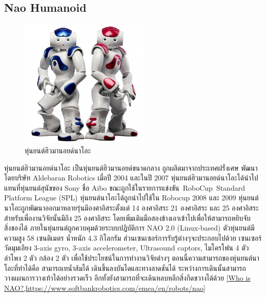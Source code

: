 \subsection*{Nao Humanoid}
\begin{figure}[ht]
    \centering
    \includegraphics[width=0.55\textwidth]{chapter2/images/nao.jpg}
    \caption{หุ่นยนต์ฮิวมานอยด์นาโอะ}
    \label{fig:nao_humanoid}
\end{figure}
หุ่นยนต์ฮิวมานอยด์นาโอะ เป็นหุ่นยนต์ฮิวมานอยด์ขนาดกลาง ถูกผลิตมาจากประเทศฝรั่งเศษ พัฒนาโดยบริษัท Aldebaran Robotics เมื่อปี 2004 และในปี 2007
หุ่นยนต์ฮิวมานอยด์นาโอะได้นำไปแทนที่หุ่นยนต์สุนัขของ Sony ชื่อ Aibo ขณะถูกใช้ในรายการแข่งขัน RoboCup Standard Platform League (SPL) หุ่นยนต์นาโอะได้ถูกนำไปใช้ใน Robocup 2008 และ 2009 
หุ่นยนต์นาโอะถูกพัฒนาออกมาหลายรุ่นมีองศาอิสระตั้งแต่ 14 องศาอิสระ 21 องศาอิสระ และ 25 องศาอิสระ สำหรับเพื่องานวิจัยนั้นมีถึง 25 องศาอิสระ
โดยเพิ่มเติมมือสองข้างเอาเข้าไปเพื่อให้สามารถหยิบจับสิ่งของได้ ภายในหุ่นยนต์ถูกควบคุมด้วยระบบปฎิบัติการ NAO 2.0 (Linux-based) ตัวหุ่นยนต์มีความสูง 58 เซนติเมตร 
น้ำหนัก 4.3 กิโลกรัม ส่วนเซนเซอร์การรับรู้ต่างๆจะประกอบไปด้วย เซนเซอร์วัดมุมเอียง 3-axis gyro, 3-axis accelerometer, Ultrasound captors, ไมโครโฟน 4 ตัว ลำโพง 2 ตัว กล้อง 2 ตัว เพื่อใช้ประโยชน์ในการทำงานวิจัยต่างๆ
ตอนนี้ความสามารถของหุ่นยนต์นาโอะที่ทำได้คือ สามารถเทน้ำส้มได้ เดินขึ้นลงบันไดและทางลาดชันได้ ระหว่างการเดินนั้นสามารถวางแผนการวางเท้าได้อย่างรวดเร็ว
อีกทั้งยังสามารถที่จะเดินหลบหลีกสิ่งกีดขวางได้ด้วย
\ref{Who is NAO?,https://www.softbankrobotics.com/emea/en/robots/nao}

\clearpage

